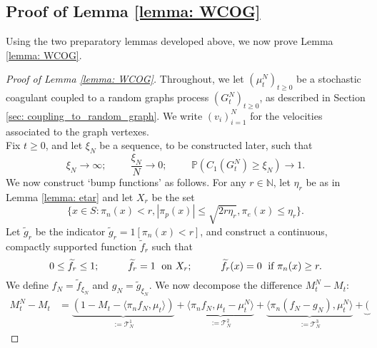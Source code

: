 \subsection{Proof of Lemma \ref{lemma: WCOG}} Using the two preparatory lemmas developed above, we now prove Lemma \ref{lemma: WCOG}. 
\begin{proof}[Proof of Lemma \ref{lemma: WCOG}]  Throughout, we let $(\mu^N_t)_{t\geq 0}$ be a stochastic coagulant coupled to a random graphs process $(G^N_t)_{t\geq 0}$, as described in Section \ref{sec: coupling_to_random_graph}. We write $(v_i)_{i=1}^N$ for the velocities associated to the graph vertexes. \medskip \\ Fix $t\ge 0$, and let $\xi_N$ be a sequence, to be constructed later, such that \begin{equation}\label{eq: choice of xiN for WCOG}
       \xi_N\rightarrow \infty; \hspace{1cm} \frac{\xi_N}{N}\rightarrow 0; \hspace{1cm}\mathbb{P}(C_1(G^N_t)\geq \xi_N)\rightarrow 1.
   \end{equation}  We now construct `bump functions' as follows.  For any $r \in \mathbb{N}$, let $\eta_r$ be as in Lemma \ref{lemma: etar} and let $X_r$ be the set \begin{equation}
       \{x \in S: \pi_n(x)< r, |\pi_p(x)|\leq \sqrt{2r\eta_r}, \pi_e(x)\leq \eta_r\}.
   \end{equation} Let $\widetilde{g}_r$ be the indicator $\widetilde{g}_r=1[\pi_n(x)< r]$, and construct a continuous, compactly supported function $\widetilde{f}_r$ such that \begin{equation}
      0\leq \widetilde{f}_r\leq 1;\hspace{1cm} \widetilde{f}_r=1 \hspace{0.1cm} \text{ on } X_r;\hspace{1cm} \widetilde{f}_r(x)=0 \hspace{0.1cm} \text{ if } \pi_n(x)\ge r.
   \end{equation} We define $f_N=\widetilde{f}_{\xi_N}$ and $g_N=\widetilde{g}_{\xi_N}$.  We now decompose the difference $M^N_t-M_t:$ \begin{equation}\label{eq: decomposition of erorr in WCOG}\begin{split} M^N_t-M_t &= \underbrace{(1-M_t-\langle \pi_n f_N, \mu_t\rangle)}_{:=\mathcal{T}^1_N} + \underbrace{\langle \pi_n f_N, \mu_t-\mu^N_t\rangle}_{:=\mathcal{T}^2_N} + \underbrace{\langle \pi_n (f_N-g_N), \mu^N_t\rangle}_{:=\mathcal{T}^3_N} +\underbrace{(
}
\end{split}
\end{equation}
\end{proof}
